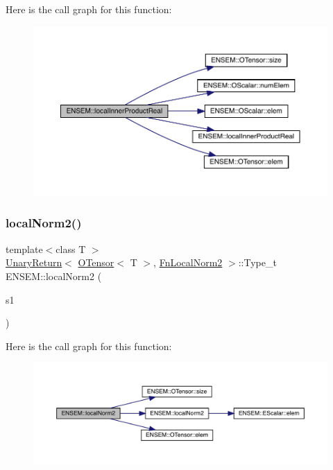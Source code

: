 Here is the call graph for this function\+:\nopagebreak
\begin{figure}[H]
\begin{center}
\leavevmode
\includegraphics[width=350pt]{de/d87/group__obstensor_ga39e2368c90f850b08cd366076195fbc4_cgraph}
\end{center}
\end{figure}
\mbox{\label{group__obstensor_ga4d3ab927a59e8e7e944243bad78ea1fd}} 
\subsubsection{\texorpdfstring{localNorm2()}{localNorm2()}}
{\footnotesize\ttfamily template$<$class T $>$ \\
\mbox{\hyperlink{structENSEM_1_1UnaryReturn}{Unary\+Return}}$<$ \mbox{\hyperlink{classENSEM_1_1OTensor}{O\+Tensor}}$<$ T $>$, \mbox{\hyperlink{structENSEM_1_1FnLocalNorm2}{Fn\+Local\+Norm2}} $>$\+::Type\+\_\+t E\+N\+S\+E\+M\+::local\+Norm2 (\begin{DoxyParamCaption}\item[{const \mbox{\hyperlink{classENSEM_1_1OTensor}{O\+Tensor}}$<$ T $>$ \&}]{s1 }\end{DoxyParamCaption})\hspace{0.3cm}{\ttfamily [inline]}}

Here is the call graph for this function\+:\nopagebreak
\begin{figure}[H]
\begin{center}
\leavevmode
\includegraphics[width=350pt]{de/d87/group__obstensor_ga4d3ab927a59e8e7e944243bad78ea1fd_cgraph}
\end{center}
\end{figure}
\mbox{\label{group__obstensor_ga256d486f79c6bee5428762a951322949}} 
